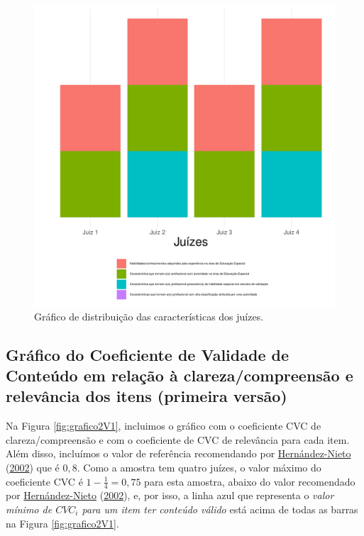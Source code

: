 \documentclass[
]{article}
\begin{document}
\begin{figure}[htbp]

{\centering \includegraphics[width=0.9\linewidth]{figures/grafico1} 

}

\caption{Gráfico de distribuição das características dos juízes.}\label{fig:grafico1}
\end{figure}

\newpage

\hypertarget{gruxe1fico-do-coeficiente-de-validade-de-conteuxfado-em-relauxe7uxe3o-uxe0-clarezacompreensuxe3o-e-relevuxe2ncia-dos-itens-primeira-versuxe3o}{%
\subsection{Gráfico do Coeficiente de Validade de Conteúdo em relação à clareza/compreensão e relevância dos itens (primeira versão)}\label{gruxe1fico-do-coeficiente-de-validade-de-conteuxfado-em-relauxe7uxe3o-uxe0-clarezacompreensuxe3o-e-relevuxe2ncia-dos-itens-primeira-versuxe3o}}

Na Figura \ref{fig:grafico2V1}, incluimos o gráfico com o coeficiente CVC de clareza/compreensão e com o coeficiente de CVC de relevância para cada item. Além disso, incluímos o valor de referência recomendando por \protect\hyperlink{ref-hernandez2002contributions}{Hernández-Nieto} (\protect\hyperlink{ref-hernandez2002contributions}{2002}) que é \(0,8\). Como a amostra tem quatro juízes, o valor máximo do coeficiente CVC é \(1-\frac{1}{4}=0,75\) para esta amostra, abaixo do valor recomendado por \protect\hyperlink{ref-hernandez2002contributions}{Hernández-Nieto} (\protect\hyperlink{ref-hernandez2002contributions}{2002}), e, por isso, a linha azul que representa o \emph{valor mínimo de \(CVC_i\) para um item ter conteúdo válido} está acima de todas as barras na Figura \ref{fig:grafico2V1}.
\end{document}
